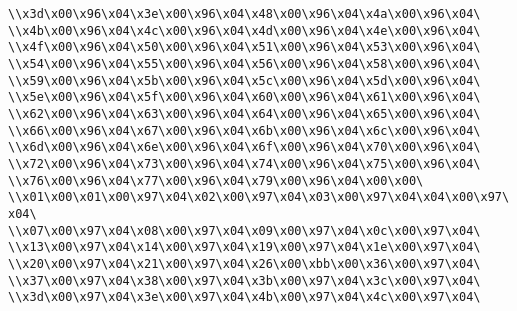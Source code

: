 \verb|\\x3d\x00\x96\x04\x3e\x00\x96\x04\x48\x00\x96\x04\x4a\x00\x96\x04\|\newline
\verb|\\x4b\x00\x96\x04\x4c\x00\x96\x04\x4d\x00\x96\x04\x4e\x00\x96\x04\|\newline
\verb|\\x4f\x00\x96\x04\x50\x00\x96\x04\x51\x00\x96\x04\x53\x00\x96\x04\|\newline
\verb|\\x54\x00\x96\x04\x55\x00\x96\x04\x56\x00\x96\x04\x58\x00\x96\x04\|\newline
\verb|\\x59\x00\x96\x04\x5b\x00\x96\x04\x5c\x00\x96\x04\x5d\x00\x96\x04\|\newline
\verb|\\x5e\x00\x96\x04\x5f\x00\x96\x04\x60\x00\x96\x04\x61\x00\x96\x04\|\newline
\verb|\\x62\x00\x96\x04\x63\x00\x96\x04\x64\x00\x96\x04\x65\x00\x96\x04\|\newline
\verb|\\x66\x00\x96\x04\x67\x00\x96\x04\x6b\x00\x96\x04\x6c\x00\x96\x04\|\newline
\verb|\\x6d\x00\x96\x04\x6e\x00\x96\x04\x6f\x00\x96\x04\x70\x00\x96\x04\|\newline
\verb|\\x72\x00\x96\x04\x73\x00\x96\x04\x74\x00\x96\x04\x75\x00\x96\x04\|\newline
\verb|\\x76\x00\x96\x04\x77\x00\x96\x04\x79\x00\x96\x04\x00\x00\|\newline
\verb|\\x01\x00\x01\x00\x97\x04\x02\x00\x97\x04\x03\x00\x97\x04\x04\x00\x97\x04\|\newline
\verb|\\x07\x00\x97\x04\x08\x00\x97\x04\x09\x00\x97\x04\x0c\x00\x97\x04\|\newline
\verb|\\x13\x00\x97\x04\x14\x00\x97\x04\x19\x00\x97\x04\x1e\x00\x97\x04\|\newline
\verb|\\x20\x00\x97\x04\x21\x00\x97\x04\x26\x00\xbb\x00\x36\x00\x97\x04\|\newline
\verb|\\x37\x00\x97\x04\x38\x00\x97\x04\x3b\x00\x97\x04\x3c\x00\x97\x04\|\newline
\verb|\\x3d\x00\x97\x04\x3e\x00\x97\x04\x4b\x00\x97\x04\x4c\x00\x97\x04\|\newline
